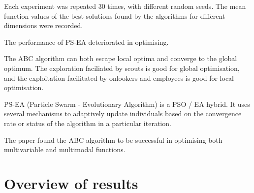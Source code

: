 \documentclass[11pt]{article} %
\begin{document}
Each experiment was repeated 30 times, with different random seeds. The mean function values of the best solutions found by the algorithms for different dimensions were recorded.

The performance of PS-EA deteriorated in optimising.

The ABC algorithm can both escape local optima and converge to the global optimum. The exploration faciliated by scouts is good for global optimisation, and the exploitation facilitated by onlookers and employees is good for local optimisation.

PS-EA (Particle Swarm - Evolutionary Algorithm) is a PSO / EA hybrid. It uses several mechanisms to adaptively update individuals based on the convergence rate or status of the algorithm in a particular iteration.


The paper found the ABC algorithm to be successful in optimising both multivariable and multimodal functions.



\section{Overview of results}
\end{document}
